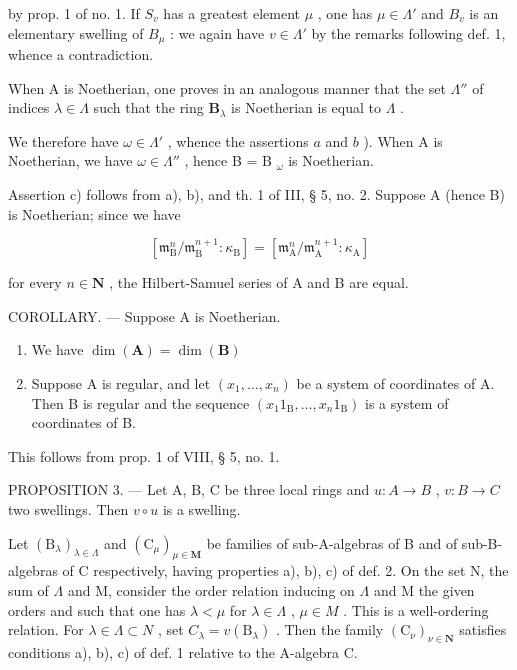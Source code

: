   by prop. 1 of no. 1. If \(S_v\) has a greatest element \(\mu\) , one has \(\mu \in \Lambda'\) and \(B_v\) is an elementary swelling of \(B_\mu\) : we again have \(v \in \Lambda'\) by the remarks following def. 1, whence a contradiction.

When A is Noetherian, one proves in an analogous manner that the set \(\Lambda''\) of indices \(\lambda \in \Lambda\) such that the ring \(\mathbf{B}_{\lambda}\) is Noetherian is equal to \(\Lambda\) .

We therefore have \(\omega\in\Lambda'\) , whence the assertions \(a\) and \(b\) ). When A is Noetherian, we have \(\omega\in\Lambda''\) , hence B = B \(_{\omega}\) is Noetherian.

Assertion c) follows from a), b), and th. 1 of III, § 5, no. 2. Suppose A (hence B) is Noetherian; since we have

\[
\left[ \mathfrak {m} _ {\mathrm{B}} ^ {n} / \mathfrak {m} _ {\mathrm{B}} ^ {n + 1}: \kappa_ {\mathrm{B}} \right] = \left[ \mathfrak {m} _ {\mathrm{A}} ^ {n} / \mathfrak {m} _ {\mathrm{A}} ^ {n + 1}: \kappa_ {\mathrm{A}} \right]
\]

for every \(n \in \mathbf{N}\) , the Hilbert-Samuel series of A and B are equal.

COROLLARY. --- Suppose A is Noetherian.

\begin{enumerate}
\def\labelenumi{\alph{enumi})}
\item
  We have \(\dim (\mathbf{A}) = \dim (\mathbf{B})\)
\item
  Suppose A is regular, and let \((x_{1},\ldots ,x_{n})\) be a system of coordinates of A. Then B is regular and the sequence \((x_{1}1_{\mathrm{B}},\dots,x_{n}1_{\mathrm{B}})\) is a system of coordinates of B.
\end{enumerate}

This follows from prop. 1 of VIII, § 5, no. 1.

PROPOSITION 3. --- Let A, B, C be three local rings and \(u:A\to B\) , \(v:B\to C\) two swellings. Then \(v\circ u\) is a swelling.

Let \((\mathrm{B}_{\lambda})_{\lambda\in\Lambda}\) and \((\mathrm{C}_{\mu})_{\mu\in\mathbf{M}}\) be families of sub-A-algebras of B and of sub-B-algebras of C respectively, having properties a), b), c) of def. 2. On the set N, the sum of \(\Lambda\) and M, consider the order relation inducing on \(\Lambda\) and M the given orders and such that one has \(\lambda<\mu\) for \(\lambda\in\Lambda\) , \(\mu\in M\) . This is a well-ordering relation. For \(\lambda\in\Lambda\subset N\) , set \(C_{\lambda}=v(\mathrm{B}_{\lambda})\) . Then the family \((\mathrm{C}_{\nu})_{\nu\in\mathbf{N}}\) satisfies conditions a), b), c) of def. 1 relative to the A-algebra C.

